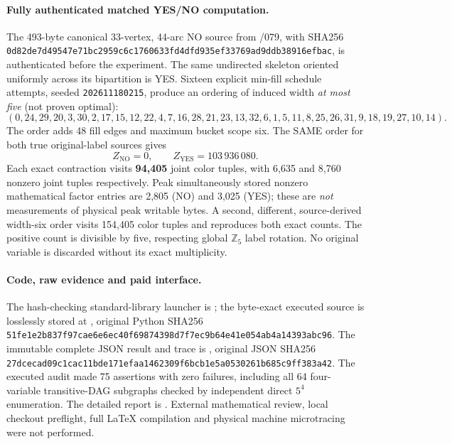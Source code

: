 \documentclass[11pt]{article}
\begin{document}
\paragraph{Fully authenticated matched YES/NO computation.}
The 493-byte canonical 33-vertex, 44-arc NO source from /079, with
SHA256 \texttt{0d82de7d49547e71bc2959c6c1760633fd4dfd935ef33769ad9ddb38916efbac},
is authenticated before the experiment.  The same undirected skeleton
oriented uniformly across its bipartition is YES.  Sixteen explicit
min-fill schedule attempts, seeded \texttt{202611180215}, produce an
ordering of induced width \emph{at most five} (not proven optimal):
\[
(0,24,29,20,3,30,2,17,15,12,22,4,7,16,28,21,23,13,32,6,
1,5,11,8,25,26,31,9,18,19,27,10,14).
\]
The order adds 48 fill edges and maximum bucket scope six.
The SAME order for both true original-label sources gives
\[
\boxed{Z_{\mathrm{NO}}=0,\qquad
Z_{\mathrm{YES}}=103\,936\,080.}
\]
Each exact contraction visits \textbf{94,405} joint color tuples,
with 6,635 and 8,760 nonzero joint tuples respectively.
Peak simultaneously stored nonzero mathematical factor entries
are 2,805 (NO) and 3,025 (YES); these are \emph{not} measurements
of physical peak writable bytes.  A second, different, source-derived
width-six order visits 154,405 color tuples and reproduces both
exact counts.  The positive count is divisible by five, respecting
global $\mathbb Z_5$ label rotation.  No original variable is discarded
without its exact multiplicity.

\paragraph{Code, raw evidence and paid interface.}
The hash-checking standard-library launcher is
; the byte-exact
executed source is losslessly stored at
,
original Python SHA256
\texttt{51fe1e2b837f97cae6e6ec40f69874398d7f7ec9b64e41e054ab4a14393abc96}.
The immutable complete JSON result and trace is
,
original JSON SHA256
\texttt{27dcecad09c1cac11bde171efaa1462309f6bcb1e5a0530261b685c9ff383a42}.
The executed audit made 75 assertions with zero failures, including
all 64 four-variable transitive-DAG subgraphs checked by independent
direct $5^4$ enumeration.  The detailed report is
.
External mathematical review, local checkout preflight,
full \LaTeX{} compilation and physical machine microtracing were
not performed.
\end{document}
